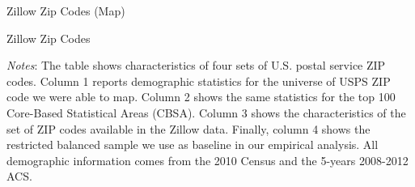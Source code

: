 \documentclass[ignorenonframetext,aspectratio=169]{beamer}
\begin{document}
\begin{frame}{Zillow Zip Codes (Map)}
\end{frame}

\begin{frame}{Zillow Zip Codes}
\protect\hypertarget{zillow-zip-codes}{}

\begin{table}[h!]
    \caption{Descriptive Statistics of Different Sets of ZIP Codes}
    \centering
    \label{tab:desc_stats}    
    
    \begin{minipage}{0.95\textwidth} \footnotesize
        \vspace{3mm} 
        \textit{Notes}: The table shows characteristics of four sets of U.S. postal service 
        ZIP codes. Column 1 reports demographic statistics for the universe of USPS ZIP code 
        we were able to map. Column 2 shows the same statistics for the top 100 Core-Based 
        Statistical Areas (CBSA). Column 3 shows the characteristics of the set of ZIP codes 
        available in the Zillow data. Finally, column 4 shows the restricted balanced sample 
        we use as baseline in our empirical analysis. All demographic information comes from 
        the 2010 Census and the 5-years 2008-2012 ACS.
    \end{minipage}
\end{table}

\end{frame}
\end{document}
